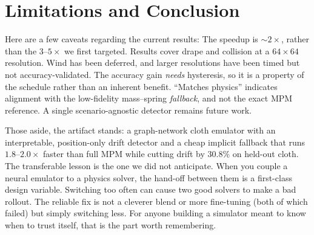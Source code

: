 \documentclass{article}
\begin{document}
\section{Limitations and Conclusion}
Here are a few caveats regarding the current results: The speedup is $\sim$$2\times$, rather than the $3$--$5\times$
we first targeted. Results cover drape and collision at a $64\times64$ resolution. Wind has been deferred, and larger resolutions have been timed but not accuracy-validated. The accuracy gain
\emph{needs} hysteresis, so it is a property of the schedule rather than an inherent benefit. ``Matches
physics'' indicates alignment with the low-fidelity mass--spring \emph{fallback}, and not the exact MPM
reference. A single scenario-agnostic detector remains future work.

Those aside, the artifact stands: a graph-network cloth emulator with an
interpretable, position-only drift detector and a cheap implicit fallback that runs
$1.8$--$2.0\times$ faster than full MPM while cutting drift by $30.8\%$ on held-out
cloth. The transferable lesson is the one we did not anticipate. When you couple a
neural emulator to a physics solver, the hand-off between them is a first-class design
variable. Switching too often can cause two good solvers to make a bad rollout. The reliable
fix is not a cleverer blend or more fine-tuning (both of which failed) but simply
switching less. For anyone building a simulator meant to know when to trust itself,
that is the part worth remembering.



\end{document}
